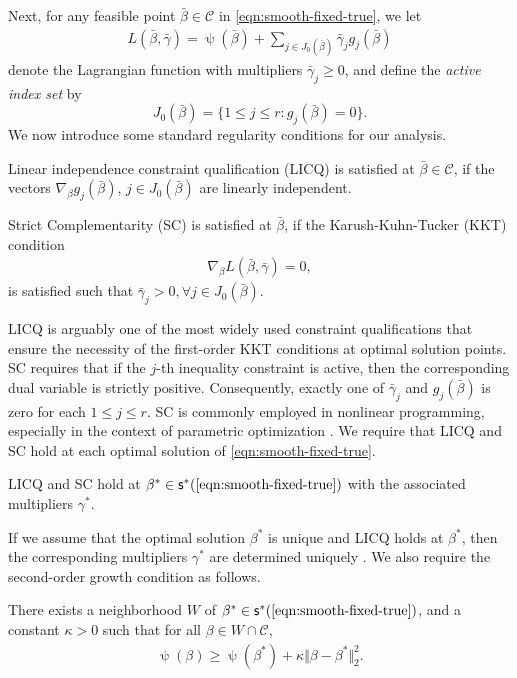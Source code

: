 Next, for any feasible point $\bar{\beta} \in \mathcal{C}$ in \ref{eqn:smooth-fixed-true}, we let
\begin{align*}
L(\bar{\beta},\bar{\gamma}) = \uppsi(\bar{\beta}) + \underset{j \in J_0(\bar{\beta})}{\sum}\bar{\gamma}_j  g_j(\bar{\beta})
\end{align*}
denote the Lagrangian function with multipliers $\bar{\gamma}_j \geq 0$, and define the \emph{active index set} by
\[
J_0(\bar{\beta}) = \{1\leq j \leq r : g_j(\bar{\beta}) = 0 \}.
\]
We now introduce some standard regularity conditions for our analysis. 
\begin{definition}[LICQ]
{Linear independence constraint qualification} (LICQ) is satisfied at $\bar{\beta} \in \mathcal{C}$, if the vectors $\nabla_\beta g_j(\bar{\beta})$, $j \in J_0(\bar{\beta})$ are linearly independent. 
\end{definition}
\begin{definition}[SC]
{Strict Complementarity} (SC) is satisfied at $\bar{\beta}$, if the Karush-Kuhn-Tucker (KKT) condition 
\begin{align*}
    \nabla_\beta L(\bar{\beta},\bar{\gamma}) = 0,
\end{align*}
is satisfied such that
$
    \bar{\gamma}_j > 0, \forall j \in J_0(\bar{\beta}).
$    
\end{definition}
LICQ is arguably one of the most widely used constraint qualifications that ensure the necessity of the first-order KKT conditions at optimal solution points.
SC requires that if the $j$-th inequality constraint is active, then the corresponding dual variable is strictly positive. Consequently, exactly one of $\bar{\gamma}_j$ and $g_j(\bar{\beta})$ is zero for each $1 \leq j \leq r$. SC is commonly employed in nonlinear programming, especially in the context of parametric optimization \citep[e.g.,][]{still2018lectures}. We require that LICQ and SC hold at each optimal solution of \ref{eqn:smooth-fixed-true}.
\begin{assumption}\label{assumption:LICQ-SC}
    LICQ and SC hold at $\beta^* \in \mathsf{s}^*(\text{\ref{eqn:smooth-fixed-true}})$ with the associated multipliers $\gamma^*$.
\end{assumption}
If we assume that the optimal solution $\beta^*$ is unique and LICQ holds at $\beta^*$, then the corresponding multipliers $\gamma^*$ are determined uniquely \citep{wachsmuth2013licq}. We also require the second-order growth condition as follows.
\begin{assumption} \label{assumption:quadratic-growth}
    There exists a neighborhood $W$ of $\beta^* \in \mathsf{s}^*(\text{\ref{eqn:smooth-fixed-true}})$, and a constant $\kappa>0$ such that for all $\beta \in W \cap \mathcal{C}$,
    \begin{align*}
        \uppsi(\beta) \geq \uppsi(\beta^*) + \kappa\Vert \beta - \beta^* \Vert_2^2.
    \end{align*}
\end{assumption}
